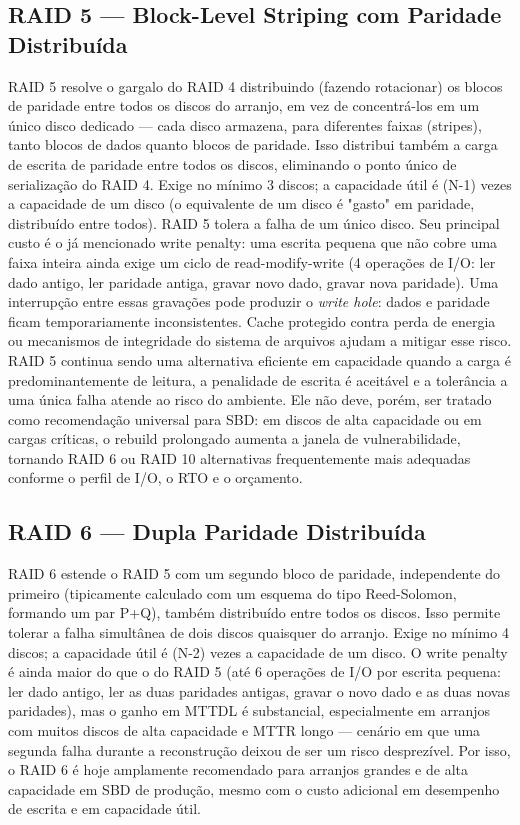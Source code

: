 \documentclass[11pt,a4paper]{article}
\begin{document}
\subsection{RAID 5 --- Block-Level Striping com Paridade Distribuída}
RAID 5 resolve o gargalo do RAID 4 distribuindo (fazendo rotacionar) os blocos de paridade entre todos os discos do arranjo, em vez de concentrá-los em um único disco dedicado --- cada disco armazena, para diferentes faixas (stripes), tanto blocos de dados quanto blocos de paridade. Isso distribui também a carga de escrita de paridade entre todos os discos, eliminando o ponto único de serialização do RAID 4. Exige no mínimo 3 discos; a capacidade útil é (N-1) vezes a capacidade de um disco (o equivalente de um disco é "gasto" em paridade, distribuído entre todos). RAID 5 tolera a falha de um único disco. Seu principal custo é o já mencionado write penalty: uma escrita pequena que não cobre uma faixa inteira ainda exige um ciclo de read-modify-write (4 operações de I/O: ler dado antigo, ler paridade antiga, gravar novo dado, gravar nova paridade). Uma interrupção entre essas gravações pode produzir o \textit{write hole}: dados e paridade ficam temporariamente inconsistentes. Cache protegido contra perda de energia ou mecanismos de integridade do sistema de arquivos ajudam a mitigar esse risco. RAID 5 continua sendo uma alternativa eficiente em capacidade quando a carga é predominantemente de leitura, a penalidade de escrita é aceitável e a tolerância a uma única falha atende ao risco do ambiente. Ele não deve, porém, ser tratado como recomendação universal para SBD: em discos de alta capacidade ou em cargas críticas, o rebuild prolongado aumenta a janela de vulnerabilidade, tornando RAID 6 ou RAID 10 alternativas frequentemente mais adequadas conforme o perfil de I/O, o RTO e o orçamento.

\subsection{RAID 6 --- Dupla Paridade Distribuída}
RAID 6 estende o RAID 5 com um segundo bloco de paridade, independente do primeiro (tipicamente calculado com um esquema do tipo Reed-Solomon, formando um par P+Q), também distribuído entre todos os discos. Isso permite tolerar a falha simultânea de dois discos quaisquer do arranjo. Exige no mínimo 4 discos; a capacidade útil é (N-2) vezes a capacidade de um disco. O write penalty é ainda maior do que o do RAID 5 (até 6 operações de I/O por escrita pequena: ler dado antigo, ler as duas paridades antigas, gravar o novo dado e as duas novas paridades), mas o ganho em MTTDL é substancial, especialmente em arranjos com muitos discos de alta capacidade e MTTR longo --- cenário em que uma segunda falha durante a reconstrução deixou de ser um risco desprezível. Por isso, o RAID 6 é hoje amplamente recomendado para arranjos grandes e de alta capacidade em SBD de produção, mesmo com o custo adicional em desempenho de escrita e em capacidade útil.
\end{document}
